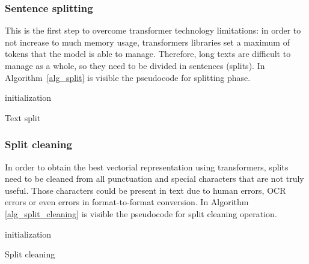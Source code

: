 \documentclass[\main/main.tex]{subfiles}
\begin{document}
\subsubsection{Sentence splitting}
This is the first step to overcome transformer technology limitations: in order to not increase to much memory usage, transformers libraries set a maximum of tokens that the model is able to manage. Therefore, long texts are difficult to manage as a whole, so they need to be divided in sentences (splits). In \mbox{Algorithm \ref{alg_split}} is visible the pseudocode for splitting phase.
\begin{center}
    \begin{algorithm}[ht]
     initialization \\
     \caption{Text split}
     \label{alg_split}
    \end{algorithm}
\end{center}
\subsubsection{Split cleaning}
In order to obtain the best vectorial representation using transformers, splits need to be cleaned from all punctuation and special characters that are not truly useful. Those characters could be present in text due to human errors, OCR errors or even errors in format-to-format conversion. In Algorithm \ref{alg_split_cleaning} is visible the pseudocode for split cleaning operation.
\begin{center}
    \begin{algorithm}[H]
     initialization \\
     \caption{Split cleaning}
     \label{alg_split_cleaning}
    \end{algorithm}
\end{center}
\end{document}
